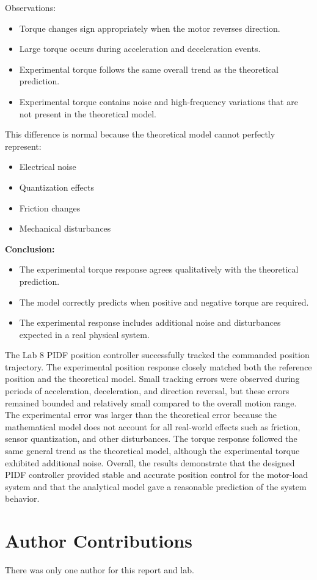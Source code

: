 \documentclass[10pt,twocolumn]{article}
\begin{document}
Observations:
\begin{itemize}
\item Torque changes sign appropriately when the motor reverses direction.
\item Large torque occurs during acceleration and deceleration events.
\item Experimental torque follows the same overall trend as the theoretical prediction.
\item Experimental torque contains noise and high-frequency variations that are not present in the theoretical model.
\end{itemize}

This difference is normal because the theoretical model cannot perfectly represent:
\begin{itemize}
\item Electrical noise
\item Quantization effects
\item Friction changes
\item Mechanical disturbances
\end{itemize}

\textbf{Conclusion:}
\begin{itemize}
\item The experimental torque response agrees qualitatively with the theoretical prediction.
\item The model correctly predicts when positive and negative torque are required.
\item The experimental response includes additional noise and disturbances expected in a real physical system.
\end{itemize}

The Lab 8 PIDF position controller successfully tracked the commanded position 
trajectory. The experimental position response closely matched both the reference 
position and the theoretical model. Small tracking errors were observed during periods 
of acceleration, deceleration, and direction reversal, but these errors remained bounded 
and relatively small compared to the overall motion range. The experimental error was 
larger than the theoretical error because the mathematical model does not account for 
all real-world effects such as friction, sensor quantization, and other disturbances. 
The torque response followed the same general trend as the theoretical model, although 
the experimental torque exhibited additional noise. Overall, the results demonstrate 
that the designed PIDF controller provided stable and accurate position control for the 
motor-load system and that the analytical model gave a reasonable prediction of the 
system behavior.


\section{Author Contributions}

There was only one author for this report and lab.







\end{document}
